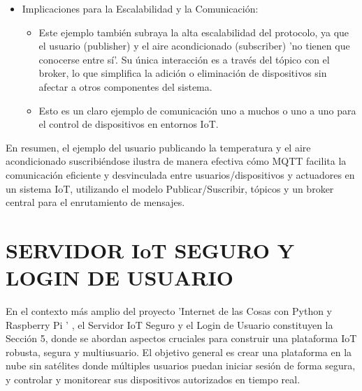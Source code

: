 \documentclass{report}
\begin{document}
\begin{itemize}
    \item Implicaciones para la Escalabilidad y la Comunicación:
        \begin{itemize}
            \item Este ejemplo también subraya la alta escalabilidad del protocolo, ya que el usuario (publisher) y el aire acondicionado 
            (subscriber) 'no tienen que conocerse entre sí'. Su única interacción es a través del tópico con el broker, lo que simplifica 
            la adición o eliminación de dispositivos sin afectar a otros componentes del sistema.
            \item Esto es un claro ejemplo de comunicación uno a muchos o uno a uno para el control de dispositivos en entornos IoT.
        \end{itemize}
\end{itemize}
En resumen, el ejemplo del usuario publicando la temperatura y el aire acondicionado suscribiéndose ilustra de manera efectiva cómo 
MQTT facilita la comunicación eficiente y desvinculada entre usuarios/dispositivos y actuadores en un sistema IoT, utilizando 
el modelo Publicar/Suscribir, tópicos y un broker central para el enrutamiento de mensajes.

\chapter{SERVIDOR IoT SEGURO Y LOGIN DE USUARIO}
En el contexto más amplio del proyecto   'Internet de las Cosas con Python y Raspberry Pi ' , el  Servidor IoT Seguro y el Login de Usuario  
constituyen la Sección 5, donde se abordan aspectos cruciales para construir una plataforma IoT robusta, segura y multiusuario. El objetivo general 
es crear una plataforma en la nube sin satélites donde múltiples usuarios puedan iniciar sesión de forma segura, y controlar y monitorear sus 
dispositivos autorizados en tiempo real.
\end{document}
